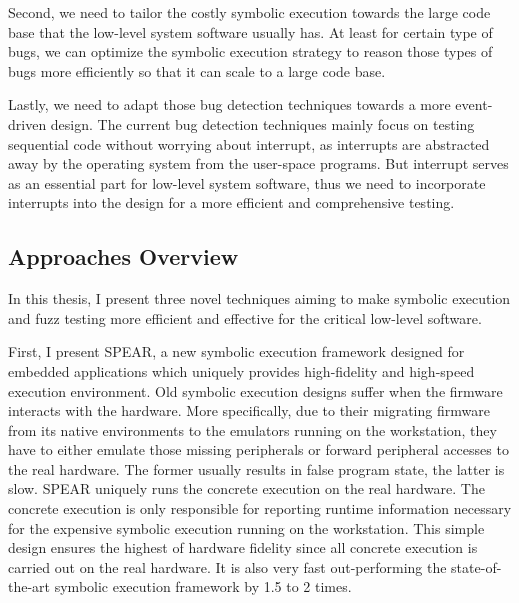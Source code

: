 Second, we need to tailor the costly symbolic execution towards the large code base that the low-level system software usually has. 
At least for certain type of bugs, we can optimize the symbolic execution strategy to reason those types of bugs more efficiently so that it can scale to a large code base. 


Lastly, we need to adapt those bug detection techniques towards a more event-driven design. The current bug detection techniques mainly focus on testing sequential code without worrying about interrupt, as interrupts are abstracted away by the operating system from the user-space programs. But interrupt serves as an essential part for low-level system software, thus we need to incorporate interrupts into the design for a more efficient and comprehensive testing. 

\subsection{Approaches Overview}
In this thesis, 
I present three novel techniques aiming to make symbolic execution and fuzz testing more efficient and effective for the critical low-level software. 

First, I present \textsc{SPEAR}, a new symbolic execution framework designed for embedded applications which uniquely provides high-fidelity and high-speed execution environment. 
Old symbolic execution designs suffer when the firmware interacts with the hardware. 
More specifically, due to their migrating firmware from its native environments to the emulators running on the workstation, they have to either emulate those missing peripherals or forward peripheral accesses to the real hardware. 
The former usually results in false program state, the latter is slow. 
\textsc{SPEAR} uniquely runs the concrete execution on the real hardware. 
The concrete execution is only responsible for reporting runtime information necessary for the expensive symbolic execution running on the workstation. 
This simple design ensures the highest of hardware fidelity since all concrete execution is carried out on the real hardware. 
It is also very fast out-performing the state-of-the-art symbolic execution framework by 1.5 to 2 times. 

